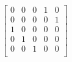 \documentclass[]{article}
\begin{document}
    \begin{math}
\begin{bmatrix}
0 &0 &0 &1 &0\\
0 &0 &0 &0 &1\\
1 &0 &0 &0 &0\\
0 &1 &0 &0 &0\\
0 &0 &1 &0 &0\\
 \end{bmatrix}    \end{math}


    
\end{document}
